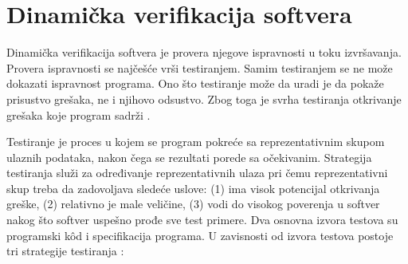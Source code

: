 \documentclass[12pt,oneside]{memoir}
\begin{document}
\section{Dinamička verifikacija softvera} \label{sec:dinamicka}

Dinamička verifikacija softvera je provera njegove ispravnosti u toku izvršavanja. Provera ispravnosti se najčešće vrši testiranjem. Samim testiranjem se ne može dokazati ispravnost programa. Ono što testiranje može da uradi je da pokaže prisustvo grešaka, ne i njihovo odsustvo. Zbog toga je svrha testiranja otkrivanje grešaka koje program sadrži \cite{mvj}.  

Testiranje je proces u kojem se program pokreće sa reprezentativnim skupom ulaznih podataka, nakon čega se rezultati porede sa očekivanim. Strategija testiranja služi za određivanje reprezentativnih ulaza pri čemu reprezentativni skup treba da zadovoljava sledeće uslove: (1) ima visok potencijal otkrivanja greške, (2) relativno je male veličine, (3) vodi do visokog poverenja u softver nakog što softver uspešno prođe sve test primere. Dva osnovna izvora testova su programski k\^od i specifikacija programa. U zavisnosti od izvora testova postoje tri strategije testiranja \cite{mvj}:
\end{document}
